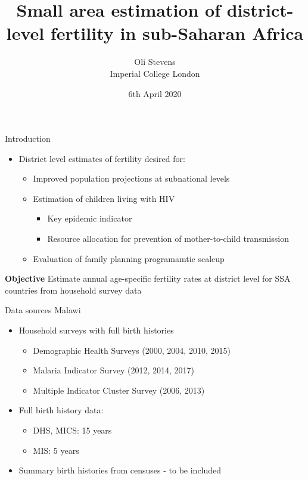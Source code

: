 \documentclass[ignorenonframetext,]{beamer}
\title{Small area estimation of district-level fertility in sub-Saharan Africa}
\author{Oli Stevens\\
Imperial College London}
\date{6th April 2020}
\providecommand{\tightlist}{%
  \setlength{\itemsep}{0pt}\setlength{\parskip}{0pt}}
\begin{document}
\frame{\titlepage}

\begin{frame}[t]{Introduction}
\protect\hypertarget{introduction}{}

\begin{itemize}
\tightlist
\item
  District level estimates of fertility desired for:

  \begin{itemize}
  \tightlist
  \item
    Improved population projections at subnational levels
  \item
    Estimation of children living with HIV

    \begin{itemize}
    \tightlist
    \item
      Key epidemic indicator
    \item
      Resource allocation for prevention of mother-to-child transmission
    \end{itemize}
  \item
    Evaluation of family planning programamtic scaleup
  \end{itemize}
\end{itemize}

\textbf{Objective} Estimate annual age-specific fertility rates at
district level for SSA countries from household survey data

\end{frame}

\begin{frame}[t]{Data sources \textbar{} Malawi}
\protect\hypertarget{data-sources-malawi}{}

\begin{itemize}
\tightlist
\item
  Household surveys with full birth histories

  \begin{itemize}
  \tightlist
  \item
    Demographic Health Surveys (2000, 2004, 2010, 2015)
  \item
    Malaria Indicator Survey (2012, 2014, 2017)
  \item
    Multiple Indicator Cluster Survey (2006, 2013)
  \end{itemize}
\item
  Full birth history data:

  \begin{itemize}
  \tightlist
  \item
    DHS, MICS: 15 years
  \item
    MIS: 5 years
  \end{itemize}
\item
  Summary birth histories from censuses - to be included
\end{itemize}

\end{frame}
\end{document}
